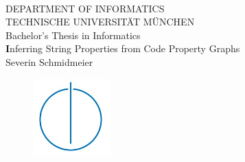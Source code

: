 \documentclass[footsepline,footinclude=false,oneside,fontsize=11pt,paper=a4,listof=totoc,bibliography=totoc]{scrbook} %
\newcommand{\thesistitle}{Inferring String Properties from Code Property Graphs}
\newcommand{\name}{Severin Schmidmeier}
\begin{document}
\nocite{*} %
\hoffset=5mm
\thispagestyle{empty}

\begin{center}
	\bigskip \bigskip \bigskip
	\oTUM{5.0cm} \\
	\vspace*{0.8cm}
	{\huge DEPARTMENT OF INFORMATICS} \\
	\bigskip \bigskip
	{\Large TECHNISCHE UNIVERSIT\"AT M\"UNCHEN} \\
	\bigskip \bigskip \bigskip \bigskip \bigskip
	{\Large Bachelor's Thesis in Informatics} \\
	\bigskip \bigskip \bigskip \bigskip \bigskip
	{\LARGE \textbf \thesistitle} \\
	\bigskip \bigskip \bigskip \bigskip
	{\Large \name} \\    
	\bigskip\bigskip
	\begin{figure}[htbp]
	\centering \includegraphics[width=3cm]{logos/infologo.jpg}
	\end{figure}
	\bigskip 
\end{center}

\vfill

\newpage
\hoffset=5mm
\thispagestyle{empty}
\end{document}
